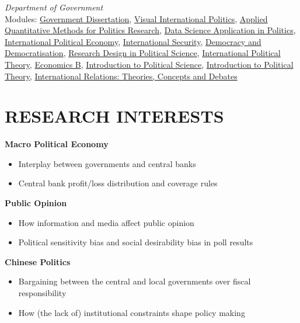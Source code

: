 \documentclass[a4paper,9pt]{extarticle}
\begin{document}
\textit{Department of Government}\vspace{0.1cm}\\ %
Modules: \href{https://www.lse.ac.uk/resources/calendar2022-2023/courseGuides/GV/2022_GV390.htm}{Government Dissertation}, \href{https://www.lse.ac.uk/resources/calendar2022-2023/courseGuides/IR/2022_IR318.htm}{Visual International Politics}, \href{https://www.lse.ac.uk/resources/calendar2022-2023/courseGuides/GV/2022_GV324.htm}{Applied Quantitative Methods for Politics Research}, 
\href{https://www.lse.ac.uk/resources/calendar2022-2023/courseGuides/GV/2022_GV330.htm}{Data Science Application in Politics}, \href{https://www.lse.ac.uk/resources/calendar2022-2023/courseGuides/IR/2022_IR206.htm}{International Political Economy}, \href{https://www.lse.ac.uk/resources/calendar2021-2022/courseGuides/IR/2021_IR205.htm}{International Security}, \href{https://www.lse.ac.uk/resources/calendar2021-2022/courseGuides/GV/2021_GV245.htm}{Democracy and 
Democratisation}, \href{https://www.lse.ac.uk/resources/calendar2021-2022/courseGuides/GV/2021_GV249.htm}{Research Design in Political Science}, \href{https://www.lse.ac.uk/resources/calendar2021-2022/courseGuides/IR/2021_IR200.htm}{International Political Theory}, \href{https://www.lse.ac.uk/resources/calendar2020-2021/courseGuides/EC/2020_EC102.htm}{Economics B}, \href{https://www.lse.ac.uk/resources/calendar2020-2021/courseGuides/GV/2020_GV101.htm}{Introduction to 
Political Science}, \href{https://www.lse.ac.uk/resources/calendar2020-2021/courseGuides/GV/2020_GV100.htm}{Introduction to Political Theory}, \href{https://www.lse.ac.uk/resources/calendar2020-2021/courseGuides/IR/2020_IR100.htm}{International Relations: Theories, Concepts and Debates}

\section*{RESEARCH INTERESTS}
\noindent
\textbf{Macro Political Economy}
\begin{itemize}
    \item Interplay between governments and central banks
    \item Central bank profit/loss distribution and coverage rules
\end{itemize}
\noindent
\textbf
{Public Opinion}
\begin{itemize}
    \item How information and media affect public opinion
    \item Political sensitivity bias and social desirability bias in poll results
\end{itemize}
\noindent
\textbf{Chinese Politics}
\begin{itemize}
    \item Bargaining between the central and local governments over fiscal responsibility
    \item How (the lack of) institutional constraints shape policy making
\end{itemize}
\end{document}
